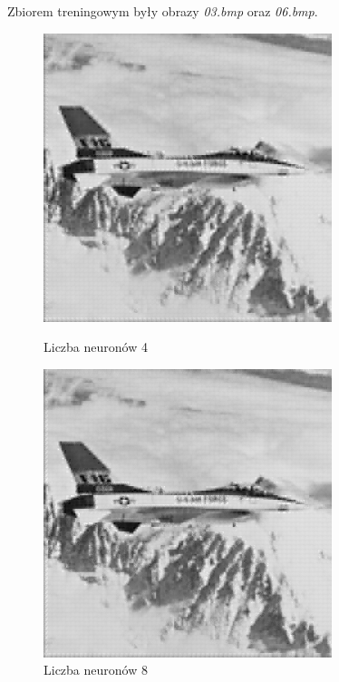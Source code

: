 \documentclass[../EDI_Task4_Karwowski_Kowalewski.tex]{subfiles}
\begin{document}
 {

    Zbiorem treningowym były obrazy \textit{03.bmp} oraz \textit{06.bmp}.
    \begin{figure}[!htbp]
        \begin{minipage}[c]{0.49\linewidth}
            \centering
            \includegraphics[width=0.75\textwidth]{img/results_3/4/compressed_08.png}
            \caption{Liczba neuronów 4}
        \end{minipage}\hfill
        \begin{minipage}[c]{0.49\linewidth}
            \centering
            \includegraphics[width=0.75\textwidth]{img/results_3/8/compressed_08.png}
            \caption{Liczba neuronów 8}
        \end{minipage}
    \end{figure}

}
\end{document}
